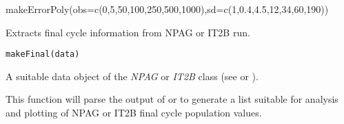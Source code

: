 \documentclass[a4paper]{book}
\begin{document}
%
\begin{Examples}
\begin{ExampleCode}
makeErrorPoly(obs=c(0,5,50,100,250,500,1000),sd=c(1,0.4,4.5,12,34,60,190))
\end{ExampleCode}
\end{Examples}
%
\begin{Description}\relax
Extracts final cycle information from NPAG or IT2B run.
\end{Description}
%
\begin{Usage}
\begin{verbatim}
makeFinal(data)
\end{verbatim}
\end{Usage}
%
\begin{Arguments}
\begin{ldescription}
\item[\code{data}] A suitable data object of the \emph{NPAG} or \emph{IT2B} class (see  or ).
\end{ldescription}
\end{Arguments}
%
\begin{Details}\relax
This function will parse the output of  or  to generate a
list suitable for analysis and plotting of NPAG  or IT2B final cycle population values.
\end{Details}
%
\end{document}

